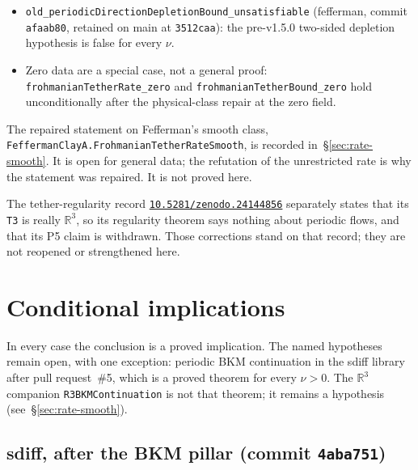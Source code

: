 \documentclass[11pt]{article}
\theoremstyle{plain}
\theoremstyle{definition}
\theoremstyle{remark}
\newcommand{\R}{\mathbb{R}}
\newcommand{\doi}[1]{\href{https://doi.org/#1}{\texttt{#1}}}
\begin{document}
{\begin{itemize}[leftmargin=1.4em]
\item \texttt{old\_\hspace{0pt}periodicDirectionDepletionBound\_\hspace{0pt}unsatisfiable} (fefferman, commit \texttt{afaab80}, retained on main at \texttt{3512caa}): the pre-v1.5.0 two-sided depletion hypothesis is false for every \(\nu\).
\item Zero data are a special case, not a general proof: \texttt{frohmanianTetherRate\_zero} and \texttt{frohmanianTetherBound\_zero} hold unconditionally after the physical-class repair at the zero field.
\end{itemize}}
{\sloppy The repaired statement on Fefferman's smooth class, \texttt{FeffermanClayA.\allowbreak FrohmanianTether\allowbreak RateSmooth}, is recorded in~\S\ref{sec:rate-smooth}. It is open for general data; the refutation of the unrestricted rate is why the statement was repaired. It is not proved here.}

The tether-regularity record \doi{10.5281/zenodo.24144856} separately states that its \texttt{T3} is really \(\R^{3}\), so its regularity theorem says nothing about periodic flows, and that its P5 claim is withdrawn. Those corrections stand on that record; they are not reopened or strengthened here.

\section{Conditional implications}

In every case the conclusion is a proved implication. The named hypotheses remain open, with one exception: periodic BKM continuation in the sdiff library after pull request~\#5, which is a proved theorem for every \(\nu>0\). The \(\R^{3}\) companion \texttt{R3BKMContinuation} is not that theorem; it remains a hypothesis (see~\S\ref{sec:rate-smooth}).

\subsection{sdiff, after the BKM pillar (commit \texttt{4aba751})}
\end{document}
